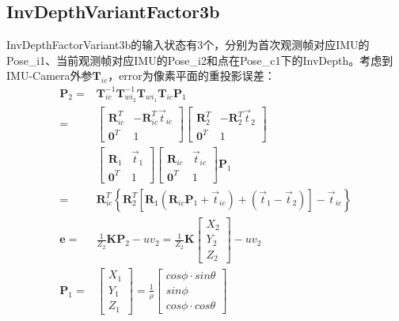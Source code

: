 \documentclass{article}
\begin{document}
\subsection{InvDepthVariantFactor3b}
InvDepthFactorVariant3b的输入状态有3个，分别为首次观测帧对应IMU的Pose\_i1、当前观测帧对应IMU的Pose\_i2和点在Pose\_c1下的InvDepth。考虑到IMU-Camera外参$\boldsymbol{T}_{ic}$，error为像素平面的重投影误差：
\begin{equation}
	\begin{aligned}
		\boldsymbol{P}_2  = & \boldsymbol{T}_{ic}^{-1}\boldsymbol{T}_{wi_2}^{-1}\boldsymbol{T}_{wi_1}\boldsymbol{T}_{ic}\boldsymbol{P}_1 \\=&
		\left[
		\begin{matrix}
		\boldsymbol{R}_{ic}^T & -\boldsymbol{R}_{ic}^T\vec{t}_{ic} \\
		\boldsymbol{0}^T & 1
		\end{matrix}
		\right]
		\left[
		\begin{matrix}
		\boldsymbol{R}_2^T & -\boldsymbol{R}_2^T\vec{t}_2 \\
		\boldsymbol{0}^T & 1
		\end{matrix}
		\right] \\&
		\left[
		\begin{matrix}
		\boldsymbol{R}_1 & \vec{t}_1 \\
		\boldsymbol{0}^T & 1
		\end{matrix}
		\right]
		\left[
		\begin{matrix}
		\boldsymbol{R}_{ic} & \vec{t}_{ic} \\
		\boldsymbol{0}^T & 1
		\end{matrix}
		\right]\boldsymbol{P}_1
		\\=&
		\boldsymbol{R}_{ic}^T\left\{\boldsymbol{R}_2^{T}[\boldsymbol{R}_1(\boldsymbol{R}_{ic}\boldsymbol{P}_1+\vec{t}_{ic} )+(\vec{t}_1-\vec{t}_2)]-\vec{t}_{ic} \right\}\\
		\boldsymbol {e}       =&\frac{1}{Z_2}\boldsymbol K\boldsymbol{P}_2 -uv_2 =\frac{1}{Z_2}\boldsymbol K                               
		\left[
		\begin{matrix}
		X_2 \\
		Y_2 \\
		Z_2 
		\end{matrix}
		\right]-uv_2 \\
		\boldsymbol{P}_1      =&
		\left[                  
		\begin{matrix}          
		X_1                     \\
		Y_1                     \\
		Z_1                     
		\end{matrix}            
		\right]                 
		=\frac{1}{\rho}         
		\left[                  
		\begin{matrix}          
		cos\phi \cdot sin\theta \\
		sin\phi                 \\
		cos\phi \cdot cos\theta 
		\end{matrix}            
		\right]                 
	\end{aligned}
\end{equation}
\end{document}
